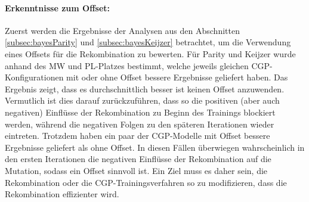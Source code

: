 \paragraph{Erkenntnisse zum Offset:}
Zuerst werden die Ergebnisse der Analysen aus den Abschnitten \ref{subsec:bayesParity} und \ref{subsec:bayesKeijzer} betrachtet, um die Verwendung eines Offsets für die Rekombination zu bewerten.
Für Parity und Keijzer wurde anhand des MW und PL-Platzes bestimmt, welche jeweils gleichen CGP-Konfigurationen mit oder ohne Offset bessere Ergebnisse geliefert haben.
Das Ergebnis zeigt, dass es durchschnittlich besser ist keinen Offset anzuwenden.
Vermutlich ist dies darauf zurückzuführen, dass so die positiven (aber auch negativen) Einflüsse der Rekombination zu Beginn des Trainings blockiert werden, während die negativen Folgen zu den späteren Iterationen wieder eintreten.
Trotzdem haben ein paar der CGP-Modelle mit Offset bessere Ergebnisse geliefert als ohne Offset.
In diesen Fällen überwiegen wahrscheinlich in den ersten Iterationen die negativen Einflüsse der Rekombination auf die Mutation, sodass ein Offset sinnvoll ist.
Ein Ziel muss es daher sein, die Rekombination oder die CGP-Trainingsverfahren so zu modifizieren, dass die Rekombination effizienter wird.
